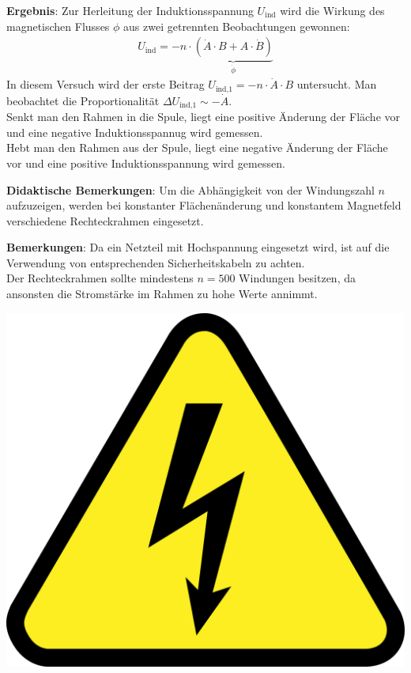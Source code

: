 \documentclass[../main.tex]{subfiles}
\begin{document}
\begin{tcolorbox}
    \vspace{0.4cm}
    \textbf{Ergebnis}: Zur Herleitung der Induktionsspannung $U_{\text{ind}}$ wird die Wirkung des magnetischen Flusses $\phi$ aus zwei getrennten Beobachtungen gewonnen:
    \begin{align*}
        U_{\text{ind}}=-n \cdot \underbrace{(\dot{A}\cdot B+ A\cdot \dot{B})}_{\dot{\phi}}
    \end{align*}
    In diesem Versuch wird der erste Beitrag $U_{\text{ind,1}}=-n\cdot \dot{A} \cdot B$ untersucht. Man beobachtet die Proportionalität $\Delta U_{\text{ind,1}} \sim -\dot{A}$. \\
    Senkt man den Rahmen in die Spule, liegt eine positive Änderung der Fläche vor und eine negative Induktionsspannug wird gemessen.\\
    Hebt man den Rahmen aus der Spule, liegt eine negative Änderung der Fläche vor und eine positive Induktionsspannung wird gemessen. 

    \vspace{0.4cm}
    \textbf{Didaktische Bemerkungen}: Um die Abhängigkeit von der Windungszahl $n$ aufzuzeigen, werden bei konstanter Flächenänderung und konstantem Magnetfeld verschiedene Rechteckrahmen eingesetzt.  

    \vspace{0.4cm}
    \begin{minipage}[c]{0.85\textwidth}
        \textbf{Bemerkungen}: Da ein Netzteil mit Hochspannung eingesetzt wird, ist auf die Verwendung von entsprechenden Sicherheitskabeln zu achten.\\
        Der Rechteckrahmen sollte mindestens $n=500$ Windungen besitzen, da ansonsten die Stromstärke im Rahmen zu hohe Werte annimmt.
    \end{minipage}
    \hspace{0.5cm}
    \begin{minipage}[c]{0.1\textwidth}
        \centering
        \includegraphics[width=1\textwidth]{img/hochspannung}
    \end{minipage}

\end{tcolorbox}
\end{document}
